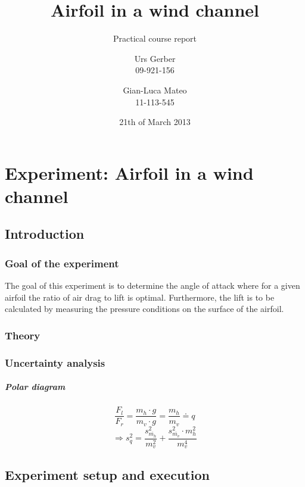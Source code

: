 \documentclass{scrreprt}
\author{Urs Gerber\\09-921-156 \and Gian-Luca Mateo\\11-113-545}
\date{21th of March 2013}
\title{Airfoil in a wind channel}
\subtitle{Practical course report}
\begin{document}
\maketitle

\tableofcontents
\newpage

\chapter{Experiment: Airfoil in a wind channel}
\section{Introduction}
\subsection{Goal of the experiment}
The goal of this experiment is to determine the angle of attack where for a given airfoil the ratio of air drag to lift is optimal. Furthermore, the lift is to be calculated by measuring the pressure conditions on the surface of the airfoil.

\subsection{Theory}

\subsection{Uncertainty analysis}
\paragraph*{Polar diagram}
\begin{equation}
\frac{F_l}{F_r} = \frac{m_h\cdot g}{m_v\cdot g} = \frac{m_h}{m_v} \doteq q
\end{equation}
\begin{equation}
\Longrightarrow s_q^2 = \frac{s_{\overline{m_h}}^2}{m_v^2} + \frac{s_{\overline{m_v}}^2 \cdot m_h^2}{m_v^4}
\end{equation}

\section{Experiment setup and execution}
\end{document}
